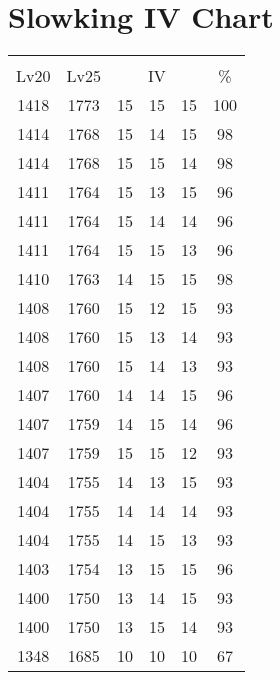 \documentclass{article}%
\begin{document}
%
\normalsize%
\section{Slowking IV Chart}%
\label{sec:Slowking IV Chart}%
\renewcommand{\arraystretch}{1.5}%
\begin{tabular}{|c|c|c|c|c|c|}%
\hline%
\multicolumn{6}{|c|}{\textcolor{white}{ 
\linebreak{Slowking}
}%
\cellcolor{black}}\\%
\multicolumn{1}{|c}{Lv20}&\multicolumn{1}{c|}{Lv25}&\multicolumn{3}{c|}{IV}&\multicolumn{1}{|c|}{\%}\\%
\hline%
\rowcolor{color100}%
1418&1773&15&15&15&100\\%
\hline%
\rowcolor{color98}%
1414&1768&15&14&15&98\\%
\hline%
\rowcolor{color98}%
1414&1768&15&15&14&98\\%
\hline%
\rowcolor{color96}%
1411&1764&15&13&15&96\\%
\hline%
\rowcolor{color96}%
1411&1764&15&14&14&96\\%
\hline%
\rowcolor{color96}%
1411&1764&15&15&13&96\\%
\hline%
\rowcolor{color98}%
1410&1763&14&15&15&98\\%
\hline%
\rowcolor{color93}%
1408&1760&15&12&15&93\\%
\hline%
\rowcolor{color93}%
1408&1760&15&13&14&93\\%
\hline%
\rowcolor{color93}%
1408&1760&15&14&13&93\\%
\hline%
\rowcolor{color96}%
1407&1760&14&14&15&96\\%
\hline%
\rowcolor{color96}%
1407&1759&14&15&14&96\\%
\hline%
\rowcolor{color93}%
1407&1759&15&15&12&93\\%
\hline%
\rowcolor{color93}%
1404&1755&14&13&15&93\\%
\hline%
\rowcolor{color93}%
1404&1755&14&14&14&93\\%
\hline%
\rowcolor{color93}%
1404&1755&14&15&13&93\\%
\hline%
\rowcolor{color96}%
1403&1754&13&15&15&96\\%
\hline%
\rowcolor{color93}%
1400&1750&13&14&15&93\\%
\hline%
\rowcolor{color93}%
1400&1750&13&15&14&93\\%
\hline%
\rowcolor{color91}%
1348&1685&10&10&10&67\\%
\end{tabular}

%
\end{document}
